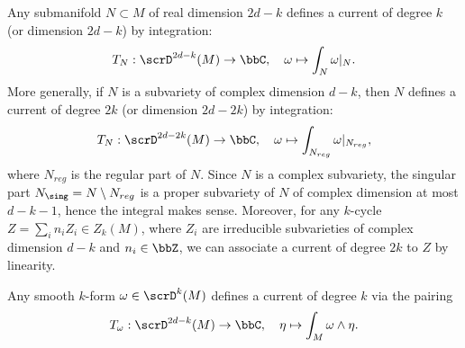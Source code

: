 \begin{example}
	Any submanifold \(N \subset M\) of real dimension \(2d - k\) defines a current of degree \(k\) (or dimension $2d-k$) by integration:
	\[ T_N: \scrD^{2d-k}(M) \to \bbC, \quad \omega \mapsto \int_N \omega|_N. \]
	More generally, if \(N\) is a subvariety of complex dimension \(d - k\), then \(N\) defines a current of degree \(2k\) (or dimension $2d-2k$) by integration:
	\[ T_N: \scrD^{2d-2k}(M) \to \bbC, \quad \omega \mapsto \int_{N_{reg}} \omega|_{N_{reg}}, \]
	where \(N_{reg}\) is the regular part of \(N\).
	Since \(N\) is a complex subvariety, the singular part \(N_{\sing} = N \setminus N_{reg}\) is a proper subvariety of \(N\) of complex dimension at most \(d - k - 1\), hence the integral makes sense.
	Moreover, for any $k$-cycle \(Z = \sum_i n_i Z_i \in Z_k(M)\), where \(Z_i\) are irreducible subvarieties of complex dimension \(d - k\) and \(n_i \in \bbZ\), we can associate a current of degree \(2k\) to \(Z\) by linearity.
\end{example}

\begin{example}
	Any smooth \(k\)-form \(\omega \in \scrD^k(M)\) defines a current of degree \(k\) via the pairing
	\[ T_\omega: \scrD^{2d-k}(M) \to \bbC, \quad \eta \mapsto \int_M \omega \wedge \eta. \]
\end{example}

%

